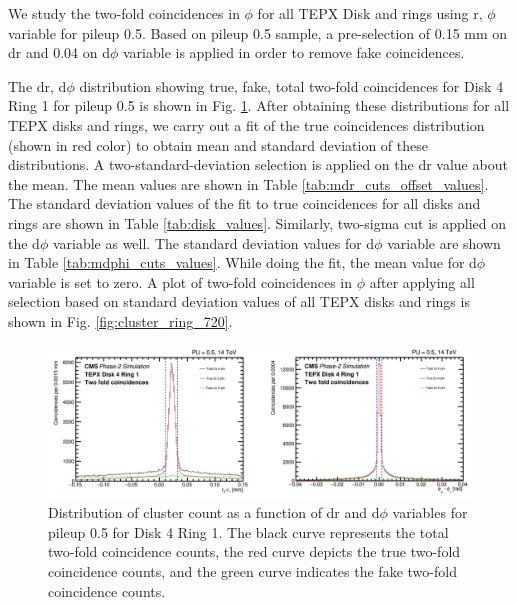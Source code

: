 We study the two-fold coincidences in $\phi$ for all TEPX Disk and rings using r, $\phi$ variable for pileup 0.5. Based on pileup 0.5 sample, a pre-selection of 0.15 mm on dr and 0.04 on d$\phi$ variable is applied in order to remove fake coincidences. 

The dr, d$\phi$ distribution showing true, fake, total two-fold coincidences for Disk 4 Ring 1 for pileup 0.5 is shown in Fig. \ref{fig:cluster_dr_dphi_dist}. After obtaining these distributions for all TEPX disks and rings, we carry out a fit of the true coincidences distribution (shown in red color) to obtain mean and standard deviation of these distributions. A two-standard-deviation selection is applied on the dr value about the mean. The mean values are shown in Table \ref{tab:mdr_cuts_offset_values}. The  standard deviation values of the fit to true coincidences for all disks and rings are shown in Table \ref{tab:disk_values}. %
Similarly, two-sigma cut is applied on the d$\phi$ variable as well. The standard deviation values for d$\phi$ variable are shown in Table \ref{tab:mdphi_cuts_values}. While doing the fit, the mean value for d$\phi$ variable is set to zero. %
A plot of two-fold coincidences in $\phi$ after applying all selection based on standard deviation values of all TEPX disks and rings is shown in Fig. \ref{fig:cluster_ring_720}.

\begin{figure}[H]
\centering
\includegraphics[width=1\textwidth]{ashish_thesis/D4R1_S2_drdphi_cut_2.png}
\caption[Pileup 0.5 Cluster Count in D4R1 vs. dr & d$\phi$]{%
  Distribution of cluster count as a function of dr and d$\phi$ variables for pileup 0.5 for Disk 4 Ring 1. The black curve represents the total two-fold coincidence counts, the red curve depicts the true two-fold coincidence counts, and the green curve indicates the fake two-fold coincidence counts.
}
\label{fig:cluster_dr_dphi_dist}
\end{figure}



